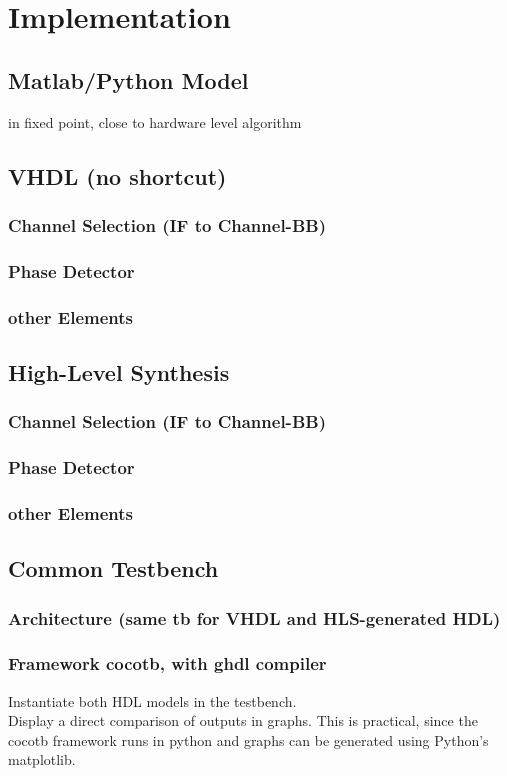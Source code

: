 \chapter{Implementation}
  \section{Matlab/Python Model}
  in fixed point, close to hardware level algorithm

  \section{VHDL (no shortcut)}
    \subsection{Channel Selection (IF to Channel-BB)}
    \subsection{Phase Detector}
    \subsection{other Elements}

  \section{High-Level Synthesis}
    \subsection{Channel Selection (IF to Channel-BB)}
    \subsection{Phase Detector}
    \subsection{other Elements}

  \section{Common Testbench}
    \subsection{Architecture (same tb for VHDL and HLS-generated HDL)}
    \subsection{Framework cocotb, with ghdl compiler}
        Instantiate both HDL models in the testbench.\\
        Display a direct comparison of outputs in graphs. This is practical, since the cocotb framework runs in python and graphs can be generated using Python's matplotlib.

